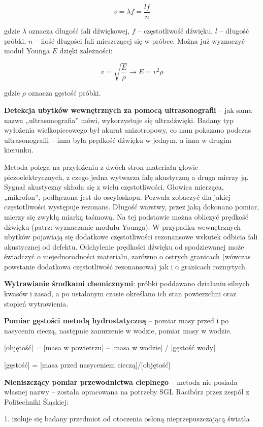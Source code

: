 \documentclass{article}
\begin{document}
\begin{enumerate}
$$v=\lambda f=\frac{lf}{n}$$


gdzie $\lambda$ oznacza długość fali dźwiękowej, $f$ – częstotliwość dźwięku, $l$ – długość próbki, $n$ – ilość długości fali mieszczącej się w próbce. Można już wyznaczyć moduł Younga $E$ dzięki zależności:

$$v=\sqrt{\frac{E}{\rho}}\rightarrow E=v^2\rho$$

gdzie $\rho$ oznacza gęstość próbki.

{\bf Detekcja ubytków wewnętrznych za pomocą ultrasonografii} – jak sama nazwa „ultrasonografia” mówi, wykorzystuje się ultradźwięki. Badany typ wyłożenia wielkopiecowego był akurat anizotropowy, co nam pokazano podczas ultrasonografii – inna była prędkość dźwięku w jednym, a inna w drugim kierunku.

Metoda polega na przyłożeniu z dwóch stron materiału głowic piezoelektrycznych, z czego jedna wytwarza falę akustyczną a druga mierzy ją. Sygnał akustyczny składa się z wielu częstotliwości. Głowica mierząca, „mikrofon”, podłączona jest do oscyloskopu. Pozwala zobaczyć dla jakiej częstotliwości występuje rezonans. Długość warstwy, przez jaką dokonano pomiar, mierzy się zwykłą miarką taśmową. Na tej podstawie można obliczyć prędkość dźwięku (patrz: wyznaczanie modułu Younga). W przypadku wewnętrznych ubytków pojawiają się dodatkowe częstotliwości rezonansowe wskutek odbicia fali akustycznej od defektu. Odchylenie prędkości dźwięku od spodziewanej może świadczyć o niejednorodności materiału, zarówno o ostrych granicach (wówczas powstanie dodatkowa częstotliwość rezonansowa) jak i o granicach rozmytych. 

{\bf Wytrawianie środkami chemicznymi}: próbki poddawano działaniu silnych kwasów i zasad, a po ustalonym czasie określano ich stan powierzchni oraz stopień wytrawienia.

{\bf Pomiar gęstości metodą hydrostatyczną} – pomiar masy przed i po nasyceniu cieczą, następnie zanurzenie w wodzie, pomiar masy w wodzie.

\begin{center}
[objętość] = [masa w powietrzu] – [masa w wodzie] / [gęstość wody]

[gęstość] = [masa przed nasyceniem cieczą]/[objętość]
\end{center}


{\bf Nieniszczący pomiar przewodnictwa cieplnego} – metoda nie posiada własnej nazwy – została opracowana na potrzeby SGL Racibórz przez zespół z Politechniki Śląskiej:

1. izoluje się badany przedmiot od otoczenia osłoną nieprzepuszczającą światła


\end{enumerate}
\end{document}
